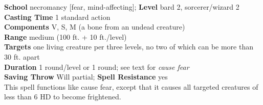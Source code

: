 \textbf{School} necromancy [fear, mind-affecting]; \textbf{Level} bard 2, sorcerer/wizard 2\\
\textbf{Casting Time} 1 standard action\\
\textbf{Components} V, S, M (a bone from an undead creature)\\
\textbf{Range }medium (100 ft. + 10 ft./level)\\
\textbf{Targets} one living creature per three levels, no two of which can be more than 30 ft. apart\\
\textbf{Duration} 1 round/level or 1 round; see text for \textit{cause fear}\\
\textbf{Saving Throw }Will partial; \textbf{Spell Resistance} yes\\
This spell functions like cause fear, except that it causes all targeted creatures of less than 6 HD to become frightened. \\
